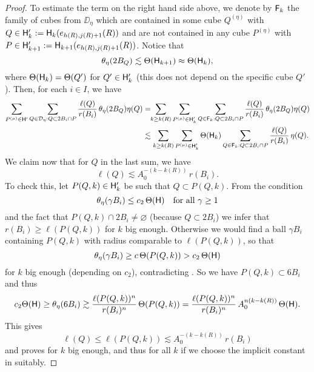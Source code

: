 \begin{proof}
To estimate the term on the right hand side above, we denote by ${\mathsf{F}}_k$ the family of cubes from
$\DD_\eta$ which are contained in some cube $Q^{(\eta)}$ with $Q\in{\mathsf{H}}_{k}':={\mathsf{H}}_{k}(e_{h(R),j(R)+1}(R))$ and are not contained
in any cube $P^{(\eta)}$ with $P\in{\mathsf{H}}_{k+1}':={\mathsf{H}}_{k+1}(e_{h(R),j(R)+1}(R))$. Notice that
$$\theta_\eta(2B_Q)\lesssim \Theta({\mathsf{H}}_{k+1})\approx \Theta({\mathsf{H}}_{k}),$$
where $\Theta({\mathsf{H}}_{k})=\Theta(Q')$ for $Q'\in{\mathsf{H}}_{k}'$ (this does not depend on the specific cube $Q'$). Then, for each $i\in I$, we have
\begin{align}\label{eqalj4}
\sum_{P^{(\mu)}\in {\mathsf{H}}'}
\sum_{Q\in{\mathcal D}_{\eta}:Q\subset 2B_i\cap P} \frac{\ell(Q)}{r(B_i)}\,\theta_\eta(2B_Q)\eta(Q) &=\!\!
\sum_{k\geq k(R)}\sum_{P^{(\mu)}\in {\mathsf{H}}'_k}
\sum_{Q\in{\mathsf{F}}_k:Q\subset 2B_i\cap P} \frac{\ell(Q)}{r(B_i)}\,\theta_\eta(2B_Q)\eta(Q)\\
& \lesssim 
\sum_{k\geq k(R)}\sum_{P^{(\mu)}\in {\mathsf{H}}'_k} \Theta({\mathsf{H}}_k)
\sum_{Q\in{\mathsf{F}}_k:Q\subset 2B_i\cap P} \frac{\ell(Q)}{r(B_i)}\,\eta(Q).\nonumber
\end{align}
We claim now that for $Q$ in the last sum, we have
\begin{equation}\label{eqcond*492}
\ell(Q)\lesssim A_0^{-(k-k(R))}\,r(B_i).
\end{equation}
To check this, let $P(Q,k)\in {\mathsf{H}}_k'$ be such that $Q\subset P(Q,k)$. From the condition 
\begin{equation}\label{eqcond492}
\theta_\eta( \gamma B_i)\leq c_2\,\Theta({\mathsf{H}}) \quad\mbox{for all $\gamma\geq1$}
\end{equation}
and the fact that $P(Q,k)\cap 2B_i\neq\varnothing$ (because $Q\subset 2B_i$) we infer that 
$r(B_i)\geq \ell(P(Q,k))$ for $k$ big enough. Otherwise we would find a ball $\gamma B_i$ containing $P(Q,k)$ with radius comparable to $\ell(P(Q,k))$, so that
$$\theta_\eta(\gamma B_i) \geq c\,\Theta(P(Q,k)) >c_2\,\Theta({\mathsf{H}})$$
for $k$ big enough (depending on $c_2$), contradicting . So we have $P(Q,k)\subset 6B_i$ and thus
$$c_2\Theta({\mathsf{H}})\geq \theta_\eta(6B_i)\gtrsim \frac{\ell(P(Q,k))^n}{r(B_i)^n}\,\Theta(P(Q,k))= 
\frac{\ell(P(Q,k))^n}{r(B_i)^n}\,A_0^{n(k-k(R))}\,\Theta({\mathsf{H}}).$$
This gives 
$$\ell(Q)\leq \ell(P(Q,k))\lesssim A_0^{-(k-k(R))}\,r(B_i)$$
and proves  for $k$ big enough, and thus for all $k$ if we choose the implicit constant in  suitably.


\end{proof}
